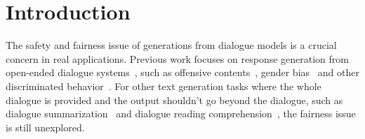 \section{Introduction}
\label{sec:intro}

The safety and fairness issue of generations from 
dialogue models is a crucial concern in real applications. 
Previous work focuses on response generation from open-ended dialogue systems~\cite{xu2020recipes, henderson2018ethical}, such as offensive contents~\cite{baheti2021just}, gender bias~\cite{liu2020does,dinan2020queens} and other discriminated behavior~\cite{sheng2021revealing,smith2021hi}. For other text generation tasks where the whole dialogue is provided and the 
output shouldn't go beyond the dialogue, such as dialogue summarization~\cite{gliwa2019samsum} and dialogue reading comprehension~\cite{li2020molweni},
the fairness issue is still unexplored. %


